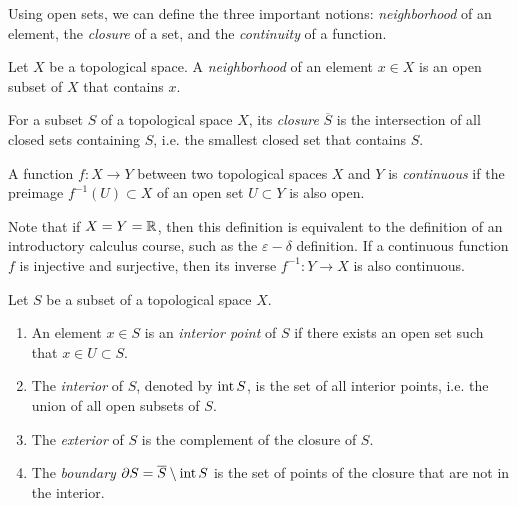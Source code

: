 Using open sets, we can define the three important notions: \emph{neighborhood} of an element, the \emph{closure} of a set, and the \emph{continuity} of a function.
\begin{definition}[Neighborhood]
    Let $X$ be a topological space. A \emph{neighborhood} of an element $x\in X$ is an open subset of $X$ that contains $x$. 
\end{definition}
\begin{definition}[Closure]
    For a subset $S$ of a topological space $X$, its \emph{closure} $\overline{S}$ is the intersection of all closed sets containing $S$, i.e. the smallest closed set that contains $S$.
\end{definition}
\begin{definition}[Continuity]\label{def:continuity-topological}
    A function $f:X\to Y$ between two topological spaces $X$ and $Y$ is \emph{continuous} if the preimage $f^{-1}(U)\subset X$ of an open set $U\subset Y$ is also open. 
\end{definition}
Note that if $X=Y=\mathbb{R}$, then this definition is equivalent to the definition of an introductory calculus course, such as the $\varepsilon-\delta$ definition. If a continuous function $f$ is injective and surjective, then its inverse $f^{-1}:Y\to X$ is also continuous.
\begin{definition}
    Let $S$ be a subset of a topological space $X$.
    \begin{enumerate}
        \item An element $x\in S$ is an \emph{interior point} of $S$ if there exists an open set such that $x\in U\subset S$.
        \item The \emph{interior} of $S$, denoted by $\operatorname{\text{int}} S$, is the set of all interior points, i.e. the union of all open subsets of $S$.
        \item The \emph{exterior} of $S$ is the complement of the closure of $S$.
        \item The \emph{boundary} $\partial S = \overline{S}\setminus\operatorname{\text{int}} S$ is the set of points of the closure that are not in the interior. 
    \end{enumerate}       
\end{definition}

